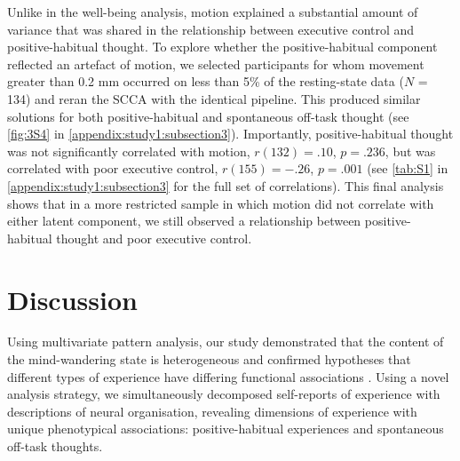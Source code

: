 Unlike in the well-being analysis, motion explained a substantial amount of variance that was shared in the relationship between executive control and positive-habitual thought. To explore whether the positive-habitual component reflected an artefact of motion, we selected participants for whom movement greater than 0.2 mm occurred on less than 5\% of the resting-state data (\(\mathit{N}\) = 134) and reran the SCCA with the identical pipeline. This produced similar solutions for both positive-habitual and spontaneous off-task thought (see \cref{fig:3S4} in \cref{appendix:study1:subsection3}). Importantly, positive-habitual thought was not significantly correlated with motion,
\(\mathit{r}(132) = .10\),
\(\mathit{p} = .236\),
but was correlated with poor executive control,
\(\mathit{r}(155) = -.26\),
\(\mathit{p} = .001\)
(see \cref{tab:S1} in \cref{appendix:study1:subsection3} for the full set of correlations).
This final analysis shows that in a more restricted sample in which motion did not correlate with either latent component, we still observed a relationship between positive-habitual thought and poor executive control.

\section{Discussion}
\label{study1:discussion}
Using multivariate pattern analysis, our study demonstrated that the content of the mind-wandering state is heterogeneous and confirmed hypotheses that different types of experience have differing functional associations \cite{SmallwoodCC2013}.
Using a novel analysis strategy, we simultaneously decomposed self-reports of experience with descriptions of neural organisation, revealing dimensions of experience with unique phenotypical associations: positive-habitual experiences and spontaneous off-task thoughts.


